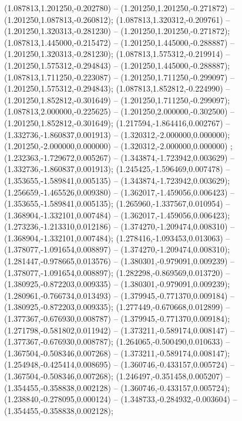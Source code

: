  (1.087813,1.201250,-0.202780) -- (1.201250,1.201250,-0.271872) -- (1.201250,1.087813,-0.260812);
 (1.087813,1.320312,-0.209761) -- (1.201250,1.320313,-0.281230) -- (1.201250,1.201250,-0.271872);
 (1.087813,1.445000,-0.215472) -- (1.201250,1.445000,-0.288887) -- (1.201250,1.320313,-0.281230);
 (1.087813,1.575312,-0.219914) -- (1.201250,1.575312,-0.294843) -- (1.201250,1.445000,-0.288887);
 (1.087813,1.711250,-0.223087) -- (1.201250,1.711250,-0.299097) -- (1.201250,1.575312,-0.294843);
 (1.087813,1.852812,-0.224990) -- (1.201250,1.852812,-0.301649) -- (1.201250,1.711250,-0.299097);
 (1.087813,2.000000,-0.225625) -- (1.201250,2.000000,-0.302500) -- (1.201250,1.852812,-0.301649);
 (1.217594,-1.864416,0.002767) -- (1.332736,-1.860837,0.001913) -- (1.320312,-2.000000,0.000000);
 (1.201250,-2.000000,0.000000) -- (1.320312,-2.000000,0.000000) ;
 (1.232363,-1.729672,0.005267) -- (1.343874,-1.723942,0.003629) -- (1.332736,-1.860837,0.001913);
 (1.245425,-1.596469,0.007478) -- (1.353655,-1.589841,0.005135) -- (1.343874,-1.723942,0.003629);
 (1.256659,-1.465526,0.009380) -- (1.362017,-1.459056,0.006423) -- (1.353655,-1.589841,0.005135);
 (1.265960,-1.337567,0.010954) -- (1.368904,-1.332101,0.007484) -- (1.362017,-1.459056,0.006423);
 (1.273236,-1.213310,0.012186) -- (1.374270,-1.209474,0.008310) -- (1.368904,-1.332101,0.007484);
 (1.278416,-1.093453,0.013063) -- (1.378077,-1.091654,0.008897) -- (1.374270,-1.209474,0.008310);
 (1.281447,-0.978665,0.013576) -- (1.380301,-0.979091,0.009239) -- (1.378077,-1.091654,0.008897);
 (1.282298,-0.869569,0.013720) -- (1.380925,-0.872203,0.009335) -- (1.380301,-0.979091,0.009239);
 (1.280961,-0.766734,0.013493) -- (1.379945,-0.771370,0.009184) -- (1.380925,-0.872203,0.009335);
 (1.277449,-0.670668,0.012899) -- (1.377367,-0.676930,0.008787) -- (1.379945,-0.771370,0.009184);
 (1.271798,-0.581802,0.011942) -- (1.373211,-0.589174,0.008147) -- (1.377367,-0.676930,0.008787);
 (1.264065,-0.500490,0.010633) -- (1.367504,-0.508346,0.007268) -- (1.373211,-0.589174,0.008147);
 (1.254948,-0.425414,0.008695) -- (1.360746,-0.433157,0.005724) -- (1.367504,-0.508346,0.007268);
 (1.246497,-0.351458,0.005207) -- (1.354455,-0.358838,0.002128) -- (1.360746,-0.433157,0.005724);
 (1.238840,-0.278095,0.000124) -- (1.348733,-0.284932,-0.003604) -- (1.354455,-0.358838,0.002128);
